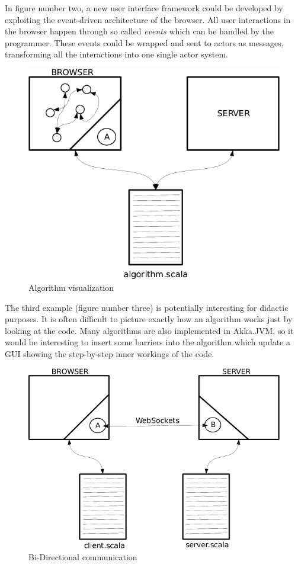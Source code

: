 \documentclass{sig-alternate}
\begin{document}
In figure number two, a new user interface framework could be developed by exploiting the event-driven
architecture of the browser. All user interactions in the browser happen through so called \emph{events}
which can be handled by the programmer. These events could be wrapped and sent to actors as messages,
transforming all the interactions into one single actor system.

\begin{figure}
\centering
\includegraphics[scale=0.3]{3.png}
\caption{Algorithm visualization}
\label{fig:algorithm}
\end{figure}

The third example (figure number three) is potentially interesting for didactic purposes. It is often difficult to picture
exactly how an algorithm works just by looking at the code. Many algorithms are also implemented
in Akka.JVM, so it would be interesting to insert some barriers into the algorithm which update a
GUI showing the step-by-step inner workings of the code.

\begin{figure}
\centering
\includegraphics[scale=0.3]{4.png}
\caption{Bi-Directional communication}
\label{fig:communication}
\end{figure}
\end{document}
